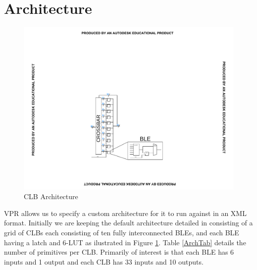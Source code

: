 \documentclass[12pt,final,oneside]{dwThesis} %
\begin{document}
\section{Architecture}\label{ArchFile}
\begin{figure}
    \begin{center}
        \includegraphics[clip,trim=8cm 4cm 8cm 8cm]{images/CLB.pdf}
        \caption{\ac{CLB} Architecture}
        \label{ArchFig}
    \end{center}
\end{figure}
\ac{VPR} allows us to specify a custom architecture for it to run against in an XML format. Initially we are keeping the default architecture detailed in \cite{VPRManual} consisting of a grid of \acp{CLB} each consisting of ten fully interconnected \acp{BLE}, and each \ac{BLE} having a latch and 6-\ac{LUT} as ilustrated in Figure \ref{ArchFig}.
Table \ref{ArchTab} details the number of primitives per \ac{CLB}. Primarily of interest is that each \ac{BLE} has 6 inputs and 1 output and each \ac{CLB} has 33 inputs and 10 outputs.


\end{document}

